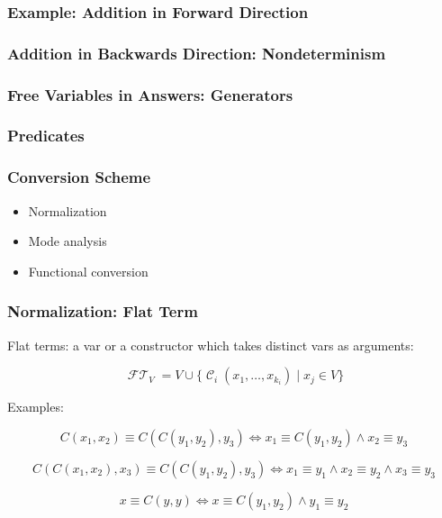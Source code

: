 \documentclass[xcolor=table]{beamer}
\DeclareMathOperator{\FlatTerm}{\mathcal{FT}}
\DeclareMathOperator{\Cons}{\mathcal{C}}
\begin{document}
\lstset{basicstyle=\small}

\begin{frame}[fragile]
  \frametitle{Example: Addition in Forward Direction}



\end{frame}

\begin{frame}[fragile]
  \frametitle{Addition in Backwards Direction: Nondeterminism}



\end{frame}

\begin{frame}[fragile]
  \frametitle{Free Variables in Answers: Generators}



\end{frame}

\begin{frame}[fragile]
  \frametitle{Predicates}
  

  
\end{frame}



\begin{frame}[fragile]
  \frametitle{Conversion Scheme}
  \begin{itemize}
    \item Normalization
    \item Mode analysis
    \item Functional conversion
  \end{itemize}
\end{frame}


\begin{frame}[fragile]
  \frametitle{Normalization: Flat Term}

Flat terms: a var or a constructor which takes distinct vars as arguments:

  \[  \FlatTerm_{V} = V \cup \{\Cons_{i}\left( x_1, \ldots, x_{k_{i}} \right) \mid x_{j}\in V\} \]

Examples:

\[ C\left( x_1, x_2 \right) \equiv C\left( C\left( y_1, y_2 \right), y_3 \right) \iff x_1 \equiv C\left( y_1, y_2 \right) \land x_2 \equiv y_3   \]

\[ C\left( C\left( x_1, x_2 \right), x_3 \right) \equiv C\left( C\left( y_1, y_2 \right), y_3 \right) \iff x_1 \equiv y_1 \land x_2 \equiv y_2 \land x_3 \equiv y_3   \]

\[x \equiv C\left( y, y \right) \iff x \equiv C\left( y_1, y_2 \right)\land y_1 \equiv y_2 \]
\end{frame}
\end{document}
